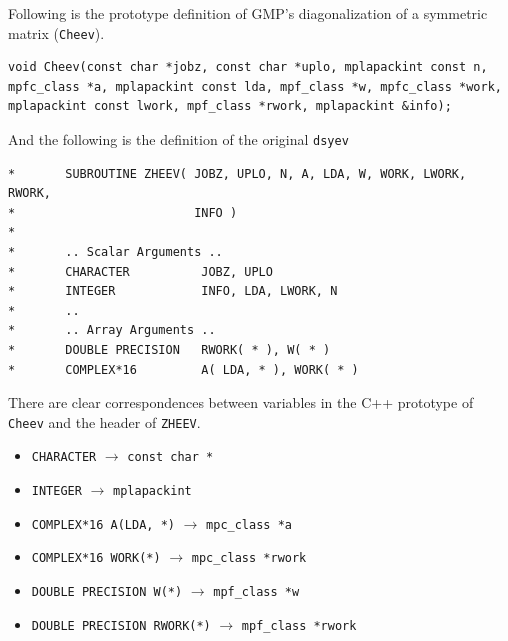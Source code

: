 \documentclass[12pt]{article}
\begin{document}
Following is the prototype definition of GMP's diagonalization of a symmetric matrix ({\tt Cheev}).
\begin{verbatim}
void Cheev(const char *jobz, const char *uplo, mplapackint const n,
mpfc_class *a, mplapackint const lda, mpf_class *w, mpfc_class *work,
mplapackint const lwork, mpf_class *rwork, mplapackint &info);
\end{verbatim}
And the following is the definition of the original {\tt dsyev}
\begin{verbatim}
*       SUBROUTINE ZHEEV( JOBZ, UPLO, N, A, LDA, W, WORK, LWORK, RWORK,
*                         INFO )
*
*       .. Scalar Arguments ..
*       CHARACTER          JOBZ, UPLO
*       INTEGER            INFO, LDA, LWORK, N
*       ..
*       .. Array Arguments ..
*       DOUBLE PRECISION   RWORK( * ), W( * )
*       COMPLEX*16         A( LDA, * ), WORK( * )

\end{verbatim}
There are clear correspondences between variables in the C++ prototype of {\tt Cheev} and the header of {\tt ZHEEV}.
\begin{itemize}
    \item {\tt CHARACTER} $\rightarrow$ {\tt const char *}
    \item {\tt INTEGER} $\rightarrow$ {\tt mplapackint}
    \item {\tt COMPLEX*16 A(LDA, *)} $\rightarrow$ {\tt mpc\_class *a}
    \item {\tt COMPLEX*16 WORK(*)} $\rightarrow$ {\tt mpc\_class *rwork}
    \item {\tt DOUBLE PRECISION W(*)} $\rightarrow$ {\tt mpf\_class *w}
    \item {\tt DOUBLE PRECISION RWORK(*)} $\rightarrow$ {\tt mpf\_class *rwork}
\end{itemize}
\end{document}
